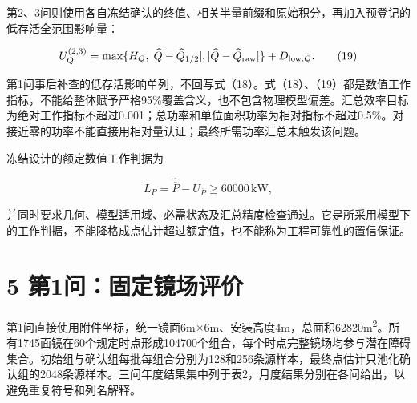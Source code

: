 \documentclass[UTF8,fontset=windows,zihao=-4]{ctexart}
\begin{document}
\par\noindent\begin{minipage}{\linewidth}
第2、3问则使用各自冻结确认的终值、相关半量前缀和原始积分，再加入预登记的低存活全范围影响量：

\[
U_Q^{(2,3)}=\max\{H_Q,|\widehat Q-\widehat Q_{1/2}|,
|\widehat Q-\widehat Q_{\rm raw}|\}+D_{{\rm low},Q}.
\tag{19}
\]
\end{minipage}\par

第1问事后补查的低存活影响单列，不回写式（18）。式（18）、（19）都是数值工作指标，不能给整体赋予严格95\%覆盖含义，也不包含物理模型偏差。汇总效率目标为绝对工作指标不超过0.001；总功率和单位面积功率为相对指标不超过0.5\%。对接近零的功率不能直接用相对量认证；最终所需功率汇总未触发该问题。

\par\noindent\begin{minipage}{\linewidth}
冻结设计的额定数值工作判据为

\[
L_P=\widehat{\overline P}-U_{\overline P}\ge60000\,\mathrm{kW},
\tag{20}
\]
\end{minipage}\par

并同时要求几何、模型适用域、必需状态及汇总精度检查通过。它是所采用模型下的工作判据，不能降格成点估计超过额定值，也不能称为工程可靠性的置信保证。

\section*{5 第1问：固定镜场评价}

第1问直接使用附件坐标，统一镜面6m\(\times\)6m、安装高度4m，总面积62820m\textsuperscript{2}。所有1745面镜在60个规定时点形成104700个组合，每个时点完整镜场均参与潜在障碍集合。初始组与确认组每批每组合分别为128和256条源样本，最终点估计只池化确认组的2048条源样本。三问年度结果集中列于表2，月度结果分别在各问给出，以避免重复符号和列名解释。
\end{document}
